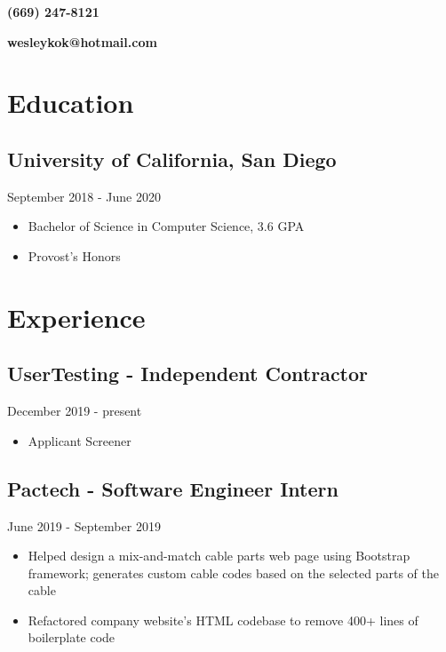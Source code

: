 \documentclass{article}
\makeatletter
\renewcommand{\maketitle}
{
{\noindent\fontsize{40pt}{0pt}\selectfont\bf\color{DarkMidnightBlue} \theauthor} 

{\vspace{-1em}\hfill\large\bf (669) 247-8121}

{\noindent\Huge \href{https://github.com/WKhiro}{\faGithub} \href{https://www.linkedin.com/in/wesley-kok/}{\color{Aquamarine}\faLinkedin}}

{\vspace{-1.5em}\hfill\large\bf wesleykok@hotmail.com}

}
\makeatother
\begin{document}
\author{Wesley Kok}
\maketitle
\thispagestyle{empty} %

\large

\section{Education}

\vspace{-0.5em}
\subsection{University of California, San Diego}\hfill {\color{Carmine}September 2018 - June 2020}
\begin{itemize}
	\item Bachelor of Science in Computer Science, 3.6 GPA
	\item Provost's Honors
\end{itemize}

\vspace{-1.5em}
\section{Experience}

\vspace{-0.5em}
\subsection{UserTesting - Independent Contractor}\hfill {\color{Carmine}December 2019 - present}
\begin{itemize}
	\item Applicant Screener
\end{itemize}

\vspace{-1em} 
\subsection{Pactech - Software Engineer Intern}\hfill {\color{Carmine}June 2019 - September 2019}
\begin{itemize}
	\item Helped design a mix-and-match cable parts web page using Bootstrap framework; generates custom cable codes based on the selected parts of the cable
	\item Refactored company website's HTML codebase to remove 400+ lines of boilerplate code
\end{itemize}
\vspace{1.5em}
\end{document}
